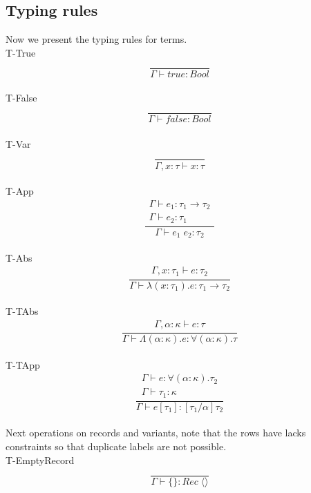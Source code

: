 \documentclass[12pt]{article}
\newcommand\kind[0]{\kappa} %
\newcommand\type[0]{\tau} %
\newcommand\tapp[2]{#1 \; #2} %
\newcommand\tarr[2]{#1 \rightarrow #2} %
\newcommand\tforall[3]{\forall(#1 : #2) . #3} %
\newcommand\tempty[0]{\langle\rangle} %
\newcommand\tbool[0]{\textit{Bool}} %
\newcommand\trecord[0]{\textit{Rec}} %
\newcommand\term[0]{e} %
\newcommand\eabs[3]{\lambda(#1 : #2) . #3} %
\newcommand\etabs[3]{\Lambda(#1 : #2) . #3} %
\newcommand\etapp[2]{#1 [ #2 ]} %
\newcommand\eempty[0]{\{\}} %
\newcommand\etrue[0]{\textit{true}} %
\newcommand\efalse[0]{\textit{false}} %
\begin{document}
\subsection{Typing rules}
Now we present the typing rules for terms. \\
T-True \[\frac{
	\begin{array}{l}
	\end{array}
}{
	\Gamma \vdash \etrue : \tbool
}\]\\
T-False \[\frac{
	\begin{array}{l}
	\end{array}
}{
	\Gamma \vdash \efalse : \tbool
}\]\\
T-Var \[\frac{
	\begin{array}{l}
	\end{array}
}{
	\Gamma , x : \type \vdash x : \type
}\]\\
T-App \[\frac{
	\begin{array}{l}
	\Gamma \vdash \term_1 : \tarr{\type_1}{\type_2} \\
	\Gamma \vdash \term_2 : \type_1
	\end{array}
}{
	\Gamma \vdash \tapp{\term_1}{\term_2} : \type_2
}\]\\
T-Abs \[\frac{
	\begin{array}{l}
	\Gamma , x : \type_1 \vdash \term : \type_2
	\end{array}
}{
	\Gamma \vdash \eabs{x}{\type_1}{\term} : \tarr{\type_1}{\type_2}
}\]\\
T-TAbs \[\frac{
	\begin{array}{l}
	\Gamma , \alpha : \kappa \vdash \term : \type
	\end{array}
}{
	\Gamma \vdash \etabs{\alpha}{\kind}{\term} : \tforall{\alpha}{\kind}{\type}
}\]\\
T-TApp \[\frac{
	\begin{array}{l}
	\Gamma \vdash \term : \tforall{\alpha}{\kind}{\type_2} \\
	\Gamma \vdash \type_1 : \kind
	\end{array}
}{
	\Gamma \vdash \etapp{\term}{\type_1} : [\type_1/\alpha]\type_2
}\]\\
Next operations on records and variants, note that the rows have lacks constraints so that duplicate labels are not possible.\\
T-EmptyRecord \[\frac{
	\begin{array}{l}
	\end{array}
}{
	\Gamma \vdash \eempty : \tapp{\trecord}{\tempty}
}\]\\
\end{document}
